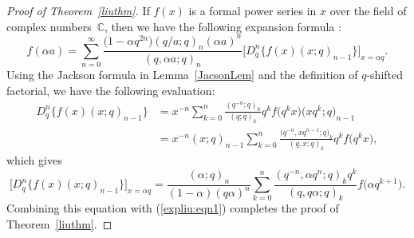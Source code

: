 \documentclass[10pt,a4paper]{amsart}
\numberwithin{equation}{section}
\begin{document}
 \begin{proof} [Proof of Theorem~\ref{liuthm}] If $f(x)$ is a formal power series in $x$ over the field of complex numbers~$\mathbb{C}$, then we have the following expansion formula \cite[Theorem~2]{Liu2002}:
	\begin{equation}\label{expliu:eqn1}
		f(\alpha a)=\sum_{n=0}^\infty \frac{\bigl(1-\alpha q^{2n}\bigr)(q/a; q)_n (\alpha a)^n}{(q, \alpha a;
			q)_n}\bigl[ {D}^n_{q}\{f(x)(x; q)_{n-1}\} \bigr]_{x=\alpha q}.
\end{equation}		
Using the Jackson formula in Lemma~\ref{JacsonLem} and the definition of $q$-shifted factorial, we have the following evaluation:
	\begin{align*}
		{D}^n_{q}\{f(x)(x; q)_{n-1}\} &{}=x^{-n}\sum_{k=0}^n \frac{(q^{-n}; q)_k}{(q; q)_k}q^k f\bigl(q^k x\bigr)\bigl(xq^k; q\bigr)_{n-1}\\
		&{}=x^{-n} (x; q)_{n-1}\sum_{k=0}^n \frac{\bigl(q^{-n}, xq^{n-1}; q\bigr)_k}{(q, x; q)_k}q^k f\bigl(q^k x\bigr),
	\end{align*}	
	which gives
	\[
	\bigl[ {D}^n_{q}\{f(x)(x; q)_{n-1}\} \bigr]_{x=\alpha q}
	=\frac{({\alpha}; q)_n }{(1-\alpha)(q\alpha)^{n}}
	\sum_{k=0}^n \frac{(q^{-n}, \alpha q^n; q)_k q^k}
	{(q, q\alpha; q)_k} f\bigl(\alpha q^{k+1}\bigr).
	\]
	Combining this equation with (\ref{expliu:eqn1}) completes the proof of Theorem~\ref{liuthm}.
 \end{proof}
\end{document}
